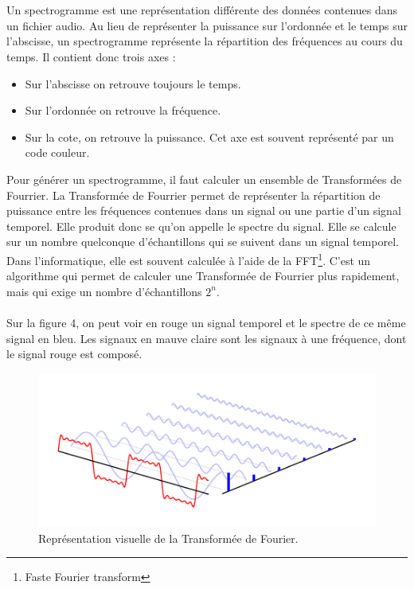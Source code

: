 \documentclass[11pt]{article}
\begin{document}
\\
\\
Un spectrogramme est une représentation différente des données contenues dans un fichier audio.
Au lieu de représenter la puissance sur l'ordonnée et le temps sur l'abscisse, un spectrogramme représente la répartition des fréquences au cours du temps.
Il contient donc trois axes :
\begin{itemize}
    \item Sur l'abscisse on retrouve toujours le temps.
    \item Sur l'ordonnée on retrouve la fréquence.
    \item Sur la cote, on retrouve la puissance. Cet axe est souvent représenté par un code couleur.
\end{itemize}

Pour générer un spectrogramme, il faut calculer un ensemble de Transformées de Fourrier.
La Transformée de Fourrier permet de représenter la répartition de puissance entre les fréquences contenues dans un signal ou une partie d'un signal temporel.
Elle produit donc se qu'on appelle le spectre du signal.
Elle se calcule sur un nombre quelconque d'échantillons qui se suivent dans un signal temporel.
Dans l'informatique, elle est souvent calculée à l'aide de la FFT\footnote{Faste Fourier transform}.
C'est un algorithme qui permet de calculer une Transformée de Fourrier plus rapidement, mais qui exige un nombre d'échantillons $2^{n}$.\\
\\
Sur la figure 4, on peut voir en rouge un signal temporel et le spectre de ce même signal en bleu.
Les signaux en mauve claire sont les signaux à une fréquence, dont le signal rouge est composé.
\begin{figure}[t]
    \begin{center}
        \includegraphics[scale=0.7]{spectre.png}
        \caption{Représentation visuelle de la Transformée de Fourier.}
    \end{center}
\end{figure}
\end{document}
